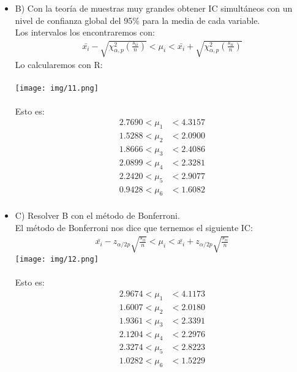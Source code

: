 \begin{sol}
\begin{itemize}
\item B) Con la teoría de muestras muy grandes obtener IC simultáneos con un nivel de confianza global del 95\% para la media de cada variable.\\
Los intervalos los encontraremos con:
\begin{align*}
\bar{x_i}-\sqrt{\chi_{\alpha,p}^2(\frac{s_{ii}}{n})} < \mu_i < \bar{x_i}+\sqrt{\chi_{\alpha,p}^2(\frac{s_{ii}}{n})}
\end{align*}
Lo calcularemos con R:\\\\
\texttt{[image: img/11.png]}\\\\
Esto es: 
\begin{align*}
 2.7690 < \mu_1 &< 4.3157 \\
 1.5288 < \mu_2 &< 2.0900 \\
 1.8666 < \mu_3 &< 2.4086 \\
 2.0899 < \mu_4 &< 2.3281 \\
 2.2420 < \mu_5 &< 2.9077 \\
 0.9428 < \mu_6 &< 1.6082 \\
\end{align*} \pagebreak
\item C) Resolver B con el método de Bonferroni. \\
El método de Bonferroni nos dice que ternemos el siguiente IC:
\begin{align*}
\bar{x_i}-z_{\alpha/ 2p}\sqrt{\frac{s_{ii}}{n}}<\mu_i<\bar{x_i}+z_{\alpha/ 2p}\sqrt{\frac{s_{ii}}{n}}
\end{align*}
\texttt{[image: img/12.png]}\\\\
Esto es:
\begin{align*}
2.9674 < \mu_1 &< 4.1173 \\
1.6007 < \mu_2 &< 2.0180 \\
1.9361 < \mu_3 &< 2.3391 \\
2.1204 < \mu_4 &< 2.2976 \\
2.3274 < \mu_5 &< 2.8223 \\
1.0282 < \mu_6 &< 1.5229 \\
\end{align*}
\end{itemize}
\end{sol}
